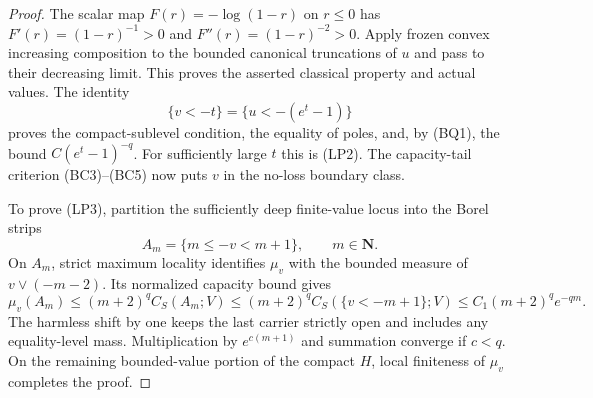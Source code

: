 \documentclass[11pt,a4paper]{article}
\numberwithin{equation}{section}
\theoremstyle{definition}
\theoremstyle{remark}
\begin{document}
\begin{proof}
The scalar map $F(r)=-\log(1-r)$ on $r\leq0$ has
$F'(r)=(1-r)^{-1}>0$ and $F''(r)=(1-r)^{-2}>0$.
Apply frozen convex increasing composition to the bounded
canonical truncations of $u$ and pass to their decreasing
limit. This proves the asserted classical property and actual
values. The identity
\[
                    \{v<-t\}=\{u<-(e^t-1)\}
 \tag{LP4}
\]
proves the compact-sublevel condition, the equality of poles,
and, by (BQ1), the bound $C(e^t-1)^{-q}$.
For sufficiently large $t$ this is (LP2).
The capacity-tail criterion (BC3)--(BC5) now puts $v$ in
the no-loss boundary class.

To prove (LP3), partition the sufficiently deep finite-value
locus into the Borel strips
\[
                     A_m=\{m\leq-v<m+1\},
                           \qquad m\in\mathbf N.
 \tag{LP5}
\]
On $A_m$, strict maximum locality identifies $\mu_v$ with
the bounded measure of $v\vee(-m-2)$. Its normalized capacity
bound gives
\[
 \mu_v(A_m)
    \leq(m+2)^q C_S(A_m;V)
    \leq(m+2)^q C_S(\{v<-m+1\};V)
    \leq C_1(m+2)^q e^{-qm}.
 \tag{LP6}
\]
The harmless shift by one keeps the last carrier strictly
open and includes any equality-level mass. Multiplication by
$e^{c(m+1)}$ and summation converge if $c<q$.
On the remaining bounded-value portion of the compact $H$,
local finiteness of $\mu_v$ completes the proof.
\end{proof}
\end{document}
